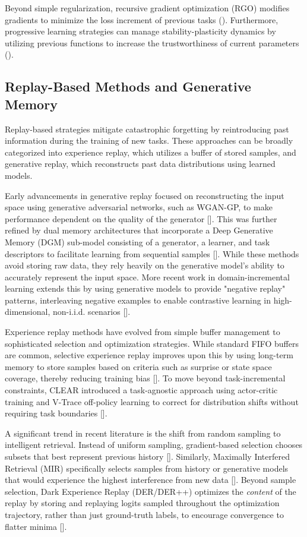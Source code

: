 \documentclass[11pt]{article}
\begin{document}
Beyond simple regularization, recursive gradient optimization (RGO) modifies gradients to minimize the loss increment of previous tasks (\citep{2201.12522}). Furthermore, progressive learning strategies can manage stability-plasticity dynamics by utilizing previous functions to increase the trustworthiness of current parameters (\citep{2211.15215}).
\subsection{Replay-Based Methods and Generative Memory}

Replay-based strategies mitigate catastrophic forgetting by reintroducing past information during the training of new tasks. These approaches can be broadly categorized into experience replay, which utilizes a buffer of stored samples, and generative replay, which reconstructs past data distributions using learned models.

Early advancements in generative replay focused on reconstructing the input space using generative adversarial networks, such as WGAN-GP, to make performance dependent on the quality of the generator [\citep{1705.08690}]. This was further refined by dual memory architectures that incorporate a Deep Generative Memory (DGM) sub-model consisting of a generator, a learner, and task descriptors to facilitate learning from sequential samples [\citep{1710.10368}]. While these methods avoid storing raw data, they rely heavily on the generative model's ability to accurately represent the input space. More recent work in domain-incremental learning extends this by using generative models to provide "negative replay" patterns, interleaving negative examples to enable contrastive learning in high-dimensional, non-i.i.d. scenarios [\citep{2204.05842}].

Experience replay methods have evolved from simple buffer management to sophisticated selection and optimization strategies. While standard FIFO buffers are common, selective experience replay improves upon this by using long-term memory to store samples based on criteria such as surprise or state space coverage, thereby reducing training bias [\citep{1802.10269}]. To move beyond task-incremental constraints, CLEAR introduced a task-agnostic approach using actor-critic training and V-Trace off-policy learning to correct for distribution shifts without requiring task boundaries [\citep{1811.11682}].

A significant trend in recent literature is the shift from random sampling to intelligent retrieval. Instead of uniform sampling, gradient-based selection chooses subsets that best represent previous history [\citep{1903.08671}]. Similarly, Maximally Interfered Retrieval (MIR) specifically selects samples from history or generative models that would experience the highest interference from new data [\citep{1908.04742}]. Beyond sample selection, Dark Experience Replay (DER/DER++) optimizes the \textit{content} of the replay by storing and replaying logits sampled throughout the optimization trajectory, rather than just ground-truth labels, to encourage convergence to flatter minima [\citep{2004.07211}].
\end{document}
